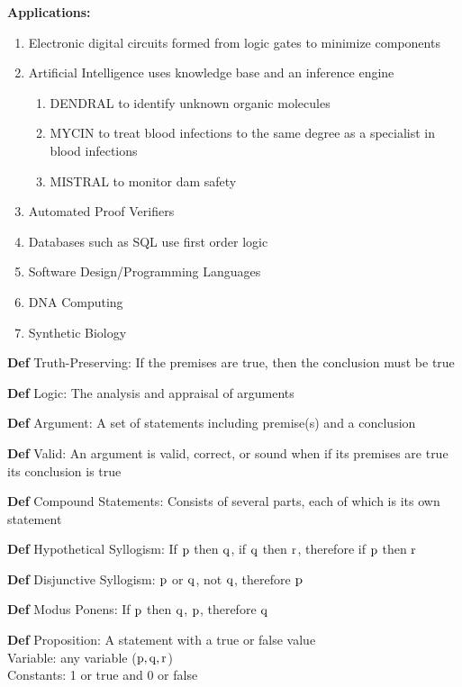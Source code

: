 \documentclass[11pt,notitlepage]{report}
\begin{document}
\textbf{Applications:}
\begin{enumerate}
    \item Electronic digital circuits formed from logic gates to minimize components
    \item Artificial Intelligence uses knowledge base and an inference engine
    \begin{enumerate}
        \item DENDRAL to identify unknown organic molecules
        \item MYCIN to treat blood infections to the same degree as a specialist in blood infections
        \item MISTRAL to monitor dam safety
    \end{enumerate}
    \item Automated Proof Verifiers
    \item Databases such as SQL use first order logic
    \item Software Design/Programming Languages
    \item DNA Computing
    \item Synthetic Biology
\end{enumerate}
\newpage

\textbf{Def} Truth-Preserving: If the premises are true, then the conclusion must be true

\textbf{Def} Logic: The analysis and appraisal of arguments

\textbf{Def} Argument: A set of statements including premise(s) and a conclusion

\textbf{Def} Valid: An argument is valid, correct, or sound when if its premises are true its conclusion is true

\textbf{Def} Compound Statements: Consists of several parts, each of which is its own statement

\textbf{Def} Hypothetical Syllogism: If $\rm p$ then $\rm q$, if $\rm q$ then $\rm r$, therefore if $\rm p$ then $\rm r$

\textbf{Def} Disjunctive Syllogism: $\rm p$ or $\rm q$, not $\rm q$, therefore $\rm p$

\textbf{Def} Modus Ponens: If $\rm p$ then $\rm q$, $\rm p$, therefore $\rm q$

\textbf{Def} Proposition: A statement with a true or false value\\
\hspace*{5mm} Variable: any variable ($\rm p, \rm q, \rm r$)\\
\hspace*{5mm} Constants: 1 or true and 0 or false
\end{document}
